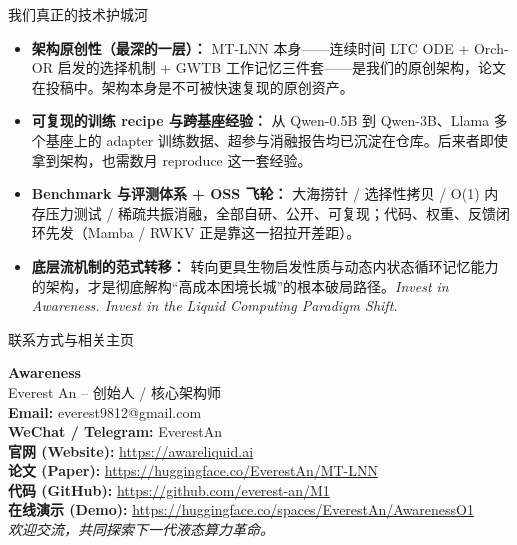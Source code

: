 \documentclass[aspectratio=169, 10pt]{beamer}
\begin{document}
\begin{frame}{我们真正的技术护城河}
\small
\begin{itemize}\itemsep=0.4em
    \item \textbf{架构原创性（最深的一层）：} MT-LNN 本身——连续时间 LTC ODE + Orch-OR 启发的选择机制 + GWTB 工作记忆三件套——是我们的原创架构，论文在投稿中。架构本身是不可被快速复现的原创资产。
    \item \textbf{可复现的训练 recipe 与跨基座经验：} 从 Qwen-0.5B 到 Qwen-3B、Llama 多个基座上的 adapter 训练数据、超参与消融报告均已沉淀在仓库。后来者即使拿到架构，也需数月 reproduce 这一套经验。
    \item \textbf{Benchmark 与评测体系 + OSS 飞轮：} 大海捞针 / 选择性拷贝 / O(1) 内存压力测试 / 稀疏共振消融，全部自研、公开、可复现；代码、权重、反馈闭环先发（Mamba / RWKV 正是靠这一招拉开差距）。
    \vspace{0.4em}
    \item \textbf{底层流机制的范式转移：} 转向更具生物启发性质与动态内状态循环记忆能力的架构，才是彻底解构“高成本困境长城”的根本破局路径。\textit{Invest in Awareness. Invest in the Liquid Computing Paradigm Shift.}
\end{itemize}
\end{frame}

\begin{frame}{联系方式与相关主页}
\begin{center}
    \LARGE \textbf{Awareness} \\
    \vspace{0.5em}
    \large Everest An -- 创始人 / 核心架构师 \\
    \vspace{1.5em}
    \normalsize
    \textbf{Email:} everest9812@gmail.com \\
    \textbf{WeChat / Telegram:} EverestAn \\
    \vspace{1.5em}
    \small
    \textbf{官网 (Website):} \url{https://awareliquid.ai} \\
    \textbf{论文 (Paper):} \url{https://huggingface.co/EverestAn/MT-LNN} \\
    \textbf{代码 (GitHub):} \url{https://github.com/everest-an/M1} \\
    \textbf{在线演示 (Demo):} \url{https://huggingface.co/spaces/EverestAn/AwarenessO1} \\
    \vspace{1.5em}
    \textit{欢迎交流，共同探索下一代液态算力革命。}
\end{center}
\end{frame}
\end{document}
